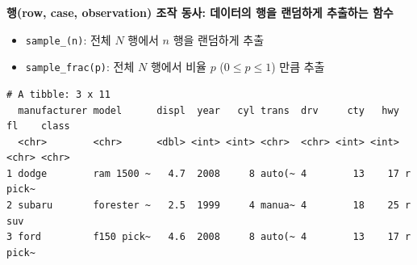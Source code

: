 \documentclass[
  11pt,
]{krantz}
\makeatletter
\newenvironment{Shaded}{\begin{snugshade}}{\end{snugshade}}
\newcommand{\CommentTok}[1]{\textcolor[rgb]{0.37,0.37,0.37}{\textit{#1}}}
\newcommand{\DecValTok}[1]{\textcolor[rgb]{0.06,0.06,0.06}{#1}}
\newcommand{\FloatTok}[1]{\textcolor[rgb]{0.06,0.06,0.06}{#1}}
\newcommand{\KeywordTok}[1]{\textcolor[rgb]{0.27,0.27,0.27}{\textbf{#1}}}
\newcommand{\NormalTok}[1]{#1}
\newcommand{\OperatorTok}[1]{\textcolor[rgb]{0.43,0.43,0.43}{\textbf{#1}}}
\newcommand{\StringTok}[1]{\textcolor[rgb]{0.5,0.5,0.5}{#1}}
\providecommand{\tightlist}{%
  \setlength{\itemsep}{0pt}\setlength{\parskip}{0pt}}
\newenvironment{kframe}{%
\medskip{}
\setlength{\fboxsep}{.8em}
 \def\at@end@of@kframe{}%
 \ifinner\ifhmode%
  \def\at@end@of@kframe{\end{minipage}}%
  \begin{minipage}{\columnwidth}%
 \fi\fi%
 \def\FrameCommand##1{\hskip\@totalleftmargin \hskip-\fboxsep
 \colorbox{shadecolor}{##1}\hskip-\fboxsep
     \hskip-\linewidth \hskip-\@totalleftmargin \hskip\columnwidth}%
 \MakeFramed {\advance\hsize-\width
   \@totalleftmargin\z@ \linewidth\hsize
   \@setminipage}}%
 {\par\unskip\endMakeFramed%
 \at@end@of@kframe}
\renewenvironment{quote}{\begin{kframe}}{\end{kframe}}
\makeatother
\begin{document}
\begin{quote}
\textbf{행(row, case, observation) 조작 동사: 데이터의 행을 랜덤하게 추출하는 함수}
\end{quote}

\begin{itemize}
\tightlist
\item
  \texttt{sample\_(n)}: 전체 \(N\) 행에서 \(n\) 행을 랜덤하게 추출
\item
  \texttt{sample\_frac(p)}: 전체 \(N\) 행에서 비율 \(p\) (\(0\leq p \leq1\)) 만큼 추출
\end{itemize}

\footnotesize

\begin{Shaded}
\end{Shaded}

\begin{verbatim}
# A tibble: 3 x 11
  manufacturer model      displ  year   cyl trans  drv     cty   hwy fl    class
  <chr>        <chr>      <dbl> <int> <int> <chr>  <chr> <int> <int> <chr> <chr>
1 dodge        ram 1500 ~   4.7  2008     8 auto(~ 4        13    17 r     pick~
2 subaru       forester ~   2.5  1999     4 manua~ 4        18    25 r     suv  
3 ford         f150 pick~   4.6  2008     8 auto(~ 4        13    17 r     pick~
\end{verbatim}

\begin{Shaded}
\end{Shaded}
\end{document}
